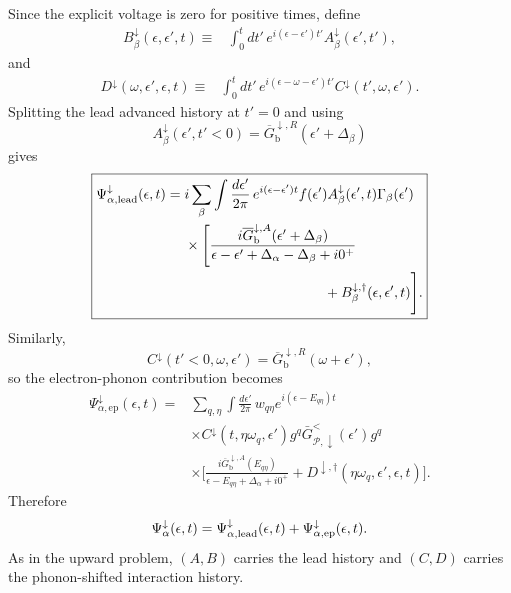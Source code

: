 \documentclass[
 reprint,
 superscriptaddress,
 amsmath,amssymb,
 aps,prb,
 longbibliography,
 floatfix
]{revtex4-2}
\newcommand{\ep}{\mathrm{ep}}
\begin{document}
Since the explicit voltage is zero for positive times, define
\begin{equation*}
\begin{aligned}
B_\beta^\downarrow
(\epsilon,\epsilon',t)
\equiv{}&
\int_0^t dt'\,
e^{i(\epsilon-\epsilon')t'}
A_\beta^\downarrow(\epsilon',t'),
\end{aligned}
\end{equation*}
and
\begin{equation*}
\begin{aligned}
D^\downarrow
(\omega,\epsilon',\epsilon,t)
\equiv{}&
\int_0^t dt'\,
e^{i(\epsilon-\omega-\epsilon')t'}
C^\downarrow(t',\omega,\epsilon').
\end{aligned}
\end{equation*}
Splitting the lead advanced history at $t'=0$ and using
\begin{equation*}
A_\beta^\downarrow(\epsilon',t'<0)
=
\overline G_{\mathrm b}^{\downarrow,R}
(\epsilon'+\Delta_\beta)
\end{equation*}
gives
\begin{equation}
\boxed{
\begin{aligned}
\Psi_{\alpha,\rm lead}^\downarrow(\epsilon,t)
={}&
i\sum_\beta
\int\frac{d\epsilon'}{2\pi}\,
e^{i(\epsilon-\epsilon')t}
f(\epsilon')
A_\beta^\downarrow(\epsilon',t)
\Gamma_\beta(\epsilon')
\\
&\times
\Bigg[
\frac{
i\overline G_{\mathrm b}^{\downarrow,A}
(\epsilon'+\Delta_\beta)}
{
\epsilon-\epsilon'
+\Delta_\alpha-\Delta_\beta+i0^+
}\\
&\qquad\qquad\qquad\qquad\qquad+
B_\beta^{\downarrow,\dagger}
(\epsilon,\epsilon',t)
\Bigg].
\end{aligned}}
\label{eq:Psi-lead-down}
\end{equation}
Similarly,
\begin{equation*}
C^\downarrow(t'<0,\omega,\epsilon')
=
\overline G_{\mathrm b}^{\downarrow,R}
(\omega+\epsilon'),
\end{equation*}
so the electron-phonon contribution becomes
\begin{equation}
\boxed{
\begin{aligned}
\Psi_{\alpha,\ep}^\downarrow(\epsilon,t)
={}&
\sum_{q,\eta}
\int\frac{d\epsilon'}{2\pi}\,
w_{q\eta}
e^{i(\epsilon-E_{q\eta})t}
\\
&\times
C^\downarrow
(t,\eta\omega_q,\epsilon')
g^q
\bar G_{\mathcal P,\downarrow}^{<}(\epsilon')
g^q
\\
&\times
\Bigg[
\frac{
i\overline G_{\mathrm b}^{\downarrow,A}(E_{q\eta})}
{\epsilon-E_{q\eta}
+\Delta_\alpha+i0^+}
+
D^{\downarrow,\dagger}
(\eta\omega_q,\epsilon',\epsilon,t)
\Bigg].
\end{aligned}}
\label{eq:Psi-ep-down}
\end{equation}
Therefore
\begin{equation*}
\Psi_\alpha^\downarrow(\epsilon,t)
=
\Psi_{\alpha,\rm lead}^\downarrow(\epsilon,t)
+
\Psi_{\alpha,\ep}^\downarrow(\epsilon,t).
\end{equation*}
As in the upward problem, $(A,B)$ carries the lead history and $(C,D)$ carries the phonon-shifted interaction history.
\end{document}
